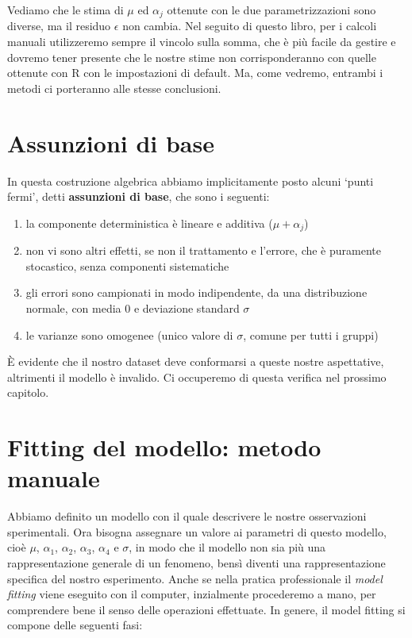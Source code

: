 \documentclass[a4paper,12pt,oneside]{book}
\providecommand{\tightlist}{%
  \setlength{\itemsep}{0pt}\setlength{\parskip}{0pt}}
\begin{document}
Vediamo che le stima di \(\mu\) ed \(\alpha_j\) ottenute con le due parametrizzazioni sono diverse, ma il residuo \(\epsilon\) non cambia. Nel seguito di questo libro, per i calcoli manuali utilizzeremo sempre il vincolo sulla somma, che è più facile da gestire e dovremo tener presente che le nostre stime non corrisponderanno con quelle ottenute con R con le impostazioni di default. Ma, come vedremo, entrambi i metodi ci porteranno alle stesse conclusioni.

\hypertarget{assunzioni-di-base}{%
\section{Assunzioni di base}\label{assunzioni-di-base}}

In questa costruzione algebrica abbiamo implicitamente posto alcuni `punti fermi', detti \textbf{assunzioni di base}, che sono i seguenti:

\begin{enumerate}
\def\labelenumi{\arabic{enumi}.}
\tightlist
\item
  la componente deterministica è lineare e additiva (\(\mu + \alpha_j\))
\item
  non vi sono altri effetti, se non il trattamento e l'errore, che è puramente stocastico, senza componenti sistematiche
\item
  gli errori sono campionati in modo indipendente, da una distribuzione normale, con media 0 e deviazione standard \(\sigma\)
\item
  le varianze sono omogenee (unico valore di \(\sigma\), comune per tutti i gruppi)
\end{enumerate}

È evidente che il nostro dataset deve conformarsi a queste nostre aspettative, altrimenti il modello è invalido. Ci occuperemo di questa verifica nel prossimo capitolo.

\hypertarget{fitting-del-modello-metodo-manuale}{%
\section{Fitting del modello: metodo manuale}\label{fitting-del-modello-metodo-manuale}}

Abbiamo definito un modello con il quale descrivere le nostre osservazioni sperimentali. Ora bisogna assegnare un valore ai parametri di questo modello, cioè \(\mu\), \(\alpha_1\), \(\alpha_2\), \(\alpha_3\), \(\alpha_4\) e \(\sigma\), in modo che il modello non sia più una rappresentazione generale di un fenomeno, bensì diventi una rappresentazione specifica del nostro esperimento. Anche se nella pratica professionale il \emph{model fitting} viene eseguito con il computer, inzialmente procederemo a mano, per comprendere bene il senso delle operazioni effettuate. In genere, il model fitting si compone delle seguenti fasi:
\end{document}
